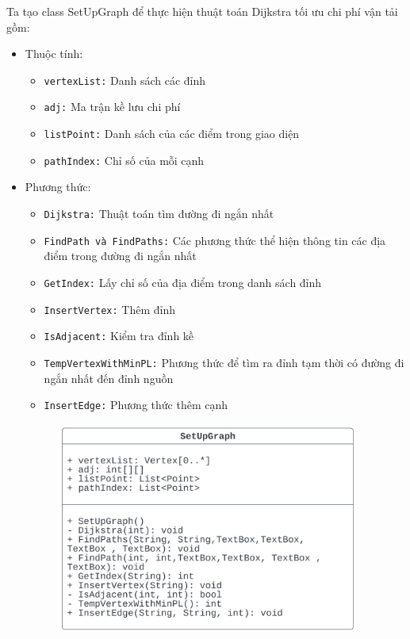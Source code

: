 \documentclass[a4paper]{article}
\begin{document}
Ta tạo class SetUpGraph để thực hiện thuật toán Dijkstra tối ưu chi phí vận tải gồm:
\begin{itemize}
    \item Thuộc tính: 
    \begin{itemize}
        \item \texttt{vertexList:} Danh sách các đỉnh
        \item \texttt{adj:} Ma trận kề lưu chi phí
        \item \texttt{listPoint:} Danh sách của các điểm trong giao diện
        \item \texttt{pathIndex:} Chỉ số của mỗi cạnh 
    \end{itemize}
    \item Phương thức: 
    \begin{itemize}
        \item \texttt{Dijkstra:} Thuật toán tìm đường đi ngắn nhất
        \item \texttt{FindPath và FindPaths:} Các phương thức thể hiện thông tin các địa điểm trong đường đi ngắn nhất
        \item \texttt{GetIndex:} Lấy chỉ số của địa điểm trong danh sách đỉnh
        \item \texttt{InsertVertex:} Thêm đỉnh
        \item \texttt{IsAdjacent:} Kiểm tra đỉnh kề
        \item \texttt{TempVertexWithMinPL:} Phương thức để tìm ra đỉnh tạm thời có đường đi ngắn nhất đến đỉnh nguồn
        \item \texttt{InsertEdge:} Phương thức thêm cạnh
    \end{itemize}
        \begin{figure}[!ht]
            \centering
            \includegraphics[width=10cm]{setup.png}
        \end{figure}
\end{itemize}
\pagebreak
\end{document}
